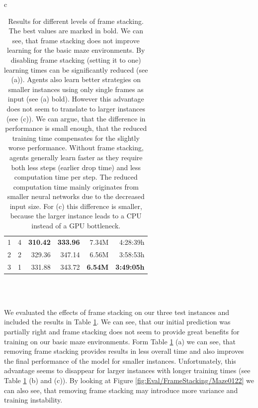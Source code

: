\begin{table}[htp]
\begin{center}
\begin{tabular}{c}
\begin{tabular}{rcrrrr}
                \midrule
                1 & 4 & \textbf{310.42} & \textbf{333.96} & 7.34M & 4:28:39h \\
                2 & 2 & 329.36 & 347.14 & 6.56M & 3:58:53h \\
                3 & 1 & 331.88 & 343.72 & \textbf{6.54M} & \textbf{3:49:05h} \\
                \bottomrule
            \end{tabular} \\
             \\
        \end{tabular}
        
    \end{center}
    \caption[Evaluation Results for Different Levels of Frame Stacking]{Results for different levels of frame stacking. The best values are marked in bold. We can see, that frame stacking does not improve learning for the basic maze environments. By disabling frame stacking (setting it to one) learning times can be significantly reduced (see (a)). Agents also learn better strategies on smaller instances using only single frames as input (see (a) bold). However this advantage does not seem to translate to larger instances (see (c)). We can argue, that the difference in performance is small enough, that the reduced training time compensates for the slightly worse performance. Without frame stacking, agents generally learn faster as they require both less steps (earlier drop time) and less computation time per step. The reduced computation time mainly originates from smaller neural networks due to the decreased input size. For (c) this difference is smaller, because the larger instance leads to a CPU instead of a GPU bottleneck.} \label{tab:Eval/FrameStacking}
\end{table}

We evaluated the effects of frame stacking on our three test instances and included the results  in Table \ref{tab:Eval/FrameStacking}. We can see, that our initial prediction was partially right and frame stacking does not seem to provide great benefits for training on our basic maze environments. Form Table \ref{tab:Eval/FrameStacking} (a) we can see, that removing frame stacking provides results in less overall time and also improves the final performance of the model for smaller instances. Unfortunately, this advantage seems to disappear for larger instances with longer training times (see Table \ref{tab:Eval/FrameStacking} (b) and (c)). By looking at Figure \ref{fig:Eval/FrameStacking/Maze0122} we can also see, that removing frame stacking may introduce more variance and training instability. 

